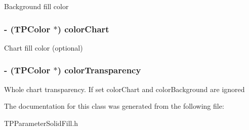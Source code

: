 Background fill color \hypertarget{interface_t_p_parameter_solid_fill_9162639d5796e2e770862c5686781115}{
\subsubsection[{colorChart}]{\setlength{\rightskip}{0pt plus 5cm}- ({\bf TPColor} $\ast$) colorChart}}
\label{interface_t_p_parameter_solid_fill_9162639d5796e2e770862c5686781115}


Chart fill color (optional) \hypertarget{interface_t_p_parameter_solid_fill_dbcae233ca7541bcb0e8fca984a04c4e}{
\subsubsection[{colorTransparency}]{\setlength{\rightskip}{0pt plus 5cm}- ({\bf TPColor} $\ast$) colorTransparency}}
\label{interface_t_p_parameter_solid_fill_dbcae233ca7541bcb0e8fca984a04c4e}


Whole chart transparency. If set colorChart and colorBackground are ignored 

The documentation for this class was generated from the following file:\begin{CompactItemize}
\item 
TPParameterSolidFill.h\end{CompactItemize}
